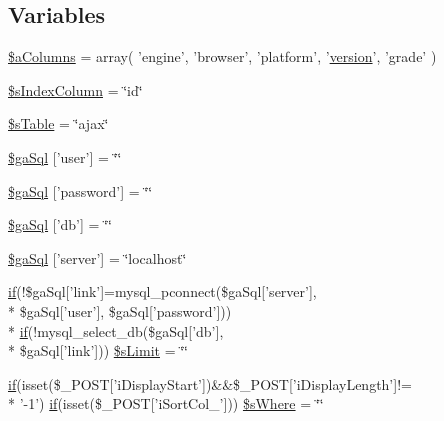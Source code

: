 \subsection*{Variables}
\begin{DoxyCompactItemize}
\item 
\hyperlink{post_8php_aba12f5ba193beb8beb9fdd0a758711e8}{\$a\+Columns} = array( 'engine', 'browser', 'platform', '\hyperlink{jquery-ui_8js_a8fa514f3aed7ddc8bfb00ed5aea5b5e2}{version}', 'grade' )
\item 
\hyperlink{post_8php_a8bddf0b8ded9777b9068de5fa9e217a2}{\$s\+Index\+Column} = \char`\"{}id\char`\"{}
\item 
\hyperlink{post_8php_a6b7d3b9c752a0c977de5ddae78b522a9}{\$s\+Table} = \char`\"{}ajax\char`\"{}
\item 
\hyperlink{post_8php_a08fc9fba5bf358871d1f80066f8930d1}{\$ga\+Sql} \mbox{[}'user'\mbox{]} = \char`\"{}\char`\"{}
\item 
\hyperlink{post_8php_a5a7f7a53d25bfc58a76a0132750c80eb}{\$ga\+Sql} \mbox{[}'password'\mbox{]} = \char`\"{}\char`\"{}
\item 
\hyperlink{post_8php_aaa5ffcba6d18eacf65c42024605b6486}{\$ga\+Sql} \mbox{[}'db'\mbox{]} = \char`\"{}\char`\"{}
\item 
\hyperlink{post_8php_a23a651ce4e9cd3741cb88709c0bfdf8e}{\$ga\+Sql} \mbox{[}'server'\mbox{]} = \char`\"{}localhost\char`\"{}
\item 
\hyperlink{fullpage_2plugin_8js_a8b98017e64ef036adb9ae327ff94abe1}{if}(!\$ga\+Sql\mbox{[}'link'\mbox{]}=mysql\+\_\+pconnect(\$ga\+Sql\mbox{[}'server'\mbox{]}, \\*
\$ga\+Sql\mbox{[}'user'\mbox{]}, \$ga\+Sql\mbox{[}'password'\mbox{]})) \\*
\hyperlink{fullpage_2plugin_8js_a8b98017e64ef036adb9ae327ff94abe1}{if}(!mysql\+\_\+select\+\_\+db(\$ga\+Sql\mbox{[}'db'\mbox{]}, \\*
\$ga\+Sql\mbox{[}'link'\mbox{]})) \hyperlink{post_8php_a867f070c3b4e597275c622aac60de587}{\$s\+Limit} = \char`\"{}\char`\"{}
\item 
\hyperlink{fullpage_2plugin_8js_a8b98017e64ef036adb9ae327ff94abe1}{if}(isset(\$\+\_\+\+P\+O\+S\+T\mbox{[}'i\+Display\+Start'\mbox{]})\&\&\$\+\_\+\+P\+O\+S\+T\mbox{[}'i\+Display\+Length'\mbox{]}!= \\*
'-\/1') \hyperlink{fullpage_2plugin_8js_a8b98017e64ef036adb9ae327ff94abe1}{if}(isset(\$\+\_\+\+P\+O\+S\+T\mbox{[}'i\+Sort\+Col\+\_'\mbox{]})) \hyperlink{post_8php_ad442a214581b05bcc9eebb6f9eb531b8}{\$s\+Where} = \char`\"{}\char`\"{}

\end{DoxyCompactItemize}
